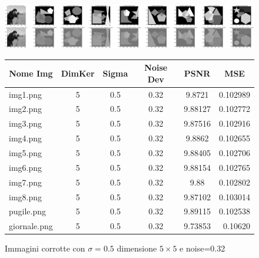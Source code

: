 \begin{figure}[H]
    \centering
    \begin{minipage}[h]{\textwidth}
    \includegraphics[width=\linewidth]{output/tabCorrotte/imgcorr5.png}\label{fig:imgcorrotte5}
    \end{minipage}
    \begin{minipage}[h]{\textwidth}
        \centering
        
        \begin{tabular}{|l c c c c r|}
            \hline
            \multicolumn{1}{|c}{\textbf{Nome Img}} & \multicolumn{1}{|c}{\textbf{DimKer}} & \multicolumn{1}{|c}{\textbf{Sigma}} & \multicolumn{1}{|c}{\textbf{Noise Dev}} & \multicolumn{1}{|c}{\textbf{PSNR}} & \multicolumn{1}{|c|}{\textbf{MSE}} \\ \hline
                img1.png & 5 & 0.5 & 0.32 & 9.8721 & 0.102989 \\                 
                img2.png & 5 & 0.5 & 0.32 & 9.88127 & 0.102772 \\ 
                img3.png & 5 & 0.5 & 0.32 & 9.87516 & 0.102916 \\
                img4.png & 5 & 0.5 & 0.32 & 9.8862 & 0.102655 \\                 
                img5.png & 5 & 0.5 & 0.32 & 9.88405 & 0.102706 \\ 
                img6.png & 5 & 0.5 & 0.32 & 9.88154 & 0.102765 \\
                img7.png & 5 & 0.5 & 0.32 & 9.88 & 0.102802 \\              
                img8.png & 5 & 0.5 & 0.32 & 9.87102 & 0.103014 \\ 
                pugile.png & 5 & 0.5 & 0.32 & 9.89115 & 0.102538 \\
                giornale.png & 5 & 0.5 & 0.32 & 9.73853 & 0.10620 \\ \hline
            \end{tabular}\label{tab:tabcorrotte5}  
        
        \end{minipage}
    \captionsetup{labelformat=andtable}
    \caption{Immagini corrotte con $\sigma = 0.5$ dimensione $5 \times 5$ e noise=0.32}
\end{figure}

